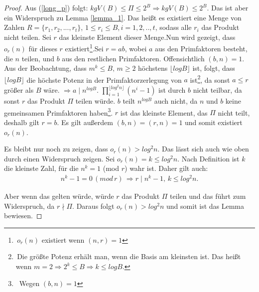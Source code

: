 \documentclass[12pt,oneside]{article}
\theoremstyle{remark}
\theoremstyle{definition}
\begin{document}
\begin{proof}
Aus (\ref{long_p}) folgt: $kgV(B) \leq \Pi \leq 2^B \Rightarrow kgV(B) \leq 2^B$. Das ist aber ein Widerspruch zu Lemma \ref{lemma_1}. Das heißt es existiert eine Menge von Zahlen $R = \{r_{1},r_{2},...,r_{t}\}$, $ 1 \leq r_i \leq B$,$\, i = 1,2, ..,t$, sodass alle $r_{i}$ das Produkt nicht teilen. Sei $r$ das kleinste Element dieser Menge.\newline\newline Nun wird gezeigt, dass $o_{r}(n)$ für dieses $r$ existiert\footnote{$ \, o_{r}(n)$ existiert wenn $(n,r) = 1$}.\newline\newline Sei $r = ab $, wobei $a$ aus den Primfaktoren besteht, die $n$ teilen, und $b$ aus den restlichen Primfaktoren. Offensichtlich $(b,n) = 1$. Aus der Beobachtung, dass $m^k \leq B, \, m \geq 2$ höchstens $\lfloor log B \rfloor$ ist, folgt, dass $ \lfloor log B \rfloor$  die höchste Potenz in der Primfaktorzerlegung von $a$ ist\footnote{ $ \,$Die größte Potenz erhält man, wenn die Basis am kleinsten ist. Das heißt wenn $m = 2 \Rightarrow 2^k \leq B \Rightarrow k \leq log B $.}, da sonst $a \leq r$ größer als $B$ wäre.\newline\newline
$\Rightarrow a \mid n^{log B}$.\newline\newline
$\prod_{i = 1}^{\lfloor log^2 n \rfloor}(n^i - 1)$ ist durch $b$ nicht teilbar, da sonst $r$ das Produkt $\Pi$ teilen würde. $b$ teilt $n^{log B}$ auch nicht, da $n$ und $b$ keine gemeinsamen Primfaktoren haben\footnote{$ \,$ Wegen $(b,n) = 1$}. $r$ ist  das kleinste Element, das $\Pi$ nicht teilt, deshalb gilt $r= b$. Es gilt außerdem $(b,n) = (r,n) = 1$  und somit existiert $o_{r}(n)$.\newline

Es bleibt nur noch zu zeigen, dass $o_{r}(n) > log^2 n$. Das lässt sich auch wie oben durch einen Widerspruch zeigen. Sei $o_{r}(n) = k \leq log^2 n$. Nach Definition ist $k$ die kleinste Zahl, für die $n^k = 1$ (mod $r$) wahr ist. Daher gilt auch:\newline\newline
\begin{align*}
    n^k - 1 = 0 \, (mod \, r) \, \Rightarrow r \mid n^k - 1, \, k \leq log^2 n.
\end{align*}

Aber wenn das gelten würde, würde $r$ das Produkt $\Pi$ teilen und das führt zum Widerspruch, da $r \nmid \Pi$. Daraus folgt $o_{r}(n) > log^2 n$ und somit ist das Lemma bewiesen. 
\end{proof}
\end{document}
